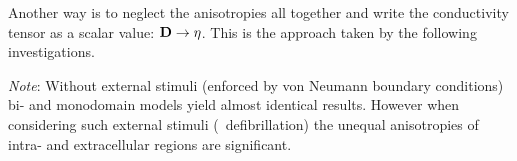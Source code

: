 Another way is to neglect the anisotropies all together and write the
conductivity tensor as a scalar value: $\mathbf{D}\to\eta$. This is the
approach taken by the following investigations.

\vspace{\baselineskip}
\emph{Note}: Without external stimuli (enforced by von Neumann boundary
conditions) bi- and monodomain models yield almost identical results.
However when considering such external stimuli (\eg~defibrillation) the
unequal anisotropies of intra- and extracellular regions are significant.


